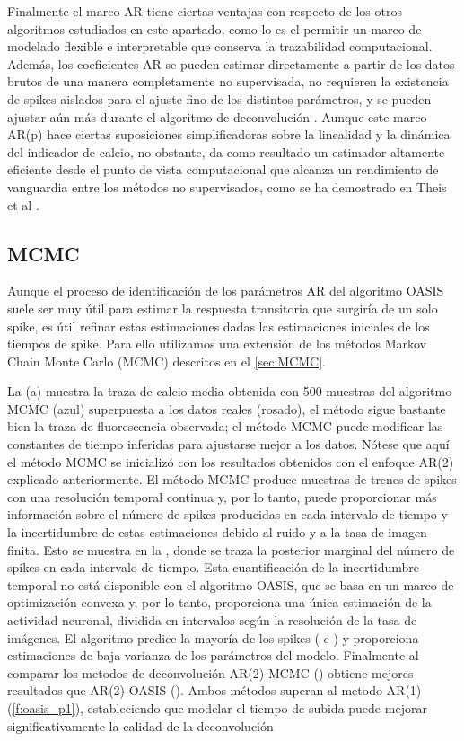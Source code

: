  Finalmente el marco AR tiene ciertas ventajas con respecto de los otros algoritmos estudiados en este apartado, como lo es el  permitir  un marco de modelado flexible e interpretable que conserva la trazabilidad computacional.   Además, los coeficientes AR se pueden estimar directamente a partir de los datos brutos de una manera completamente no supervisada, no requieren la existencia de spikes aislados para el ajuste fino de los distintos parámetros, y se pueden ajustar aún más durante el algoritmo de deconvolución \cite{pnevmatikakis_simultaneous_2016}. Aunque este marco AR(p) hace ciertas suposiciones simplificadoras sobre la linealidad y la dinámica del indicador de calcio, no obstante, da como resultado un estimador altamente eficiente desde el punto de vista computacional que alcanza un rendimiento de vanguardia entre los métodos no supervisados, como se ha demostrado  en Theis et al \cite{theis_benchmarking_2016}.
 
 \subsection{MCMC}
 
 Aunque el proceso de identificación de los parámetros AR del algoritmo OASIS suele ser muy útil para estimar la respuesta transitoria que surgiría de un solo spike, es útil refinar estas estimaciones dadas las estimaciones iniciales de los tiempos de spike. Para ello utilizamos  una extensión de los métodos Markov Chain Monte Carlo (MCMC) descritos en el \cref{sec:MCMC}. 
 
La (a) muestra la traza de calcio media obtenida con 500 muestras del algoritmo MCMC (azul) superpuesta a los datos reales (rosado), el método sigue  bastante bien la  traza de fluorescencia observada; el método MCMC puede modificar las constantes de tiempo inferidas para ajustarse mejor a los datos. Nótese que aquí el método MCMC se inicializó con los resultados obtenidos con el enfoque AR(2) explicado anteriormente. El método MCMC produce muestras de trenes de spikes con una resolución temporal continua y, por lo tanto, puede proporcionar más información sobre el número de spikes producidas en cada intervalo de tiempo y la incertidumbre de estas estimaciones debido al ruido y a la tasa de imagen finita. Esto se muestra en la , donde se traza la posterior marginal del número de spikes en cada intervalo de tiempo. Esta cuantificación de la incertidumbre temporal no está disponible con el algoritmo OASIS, que se basa en un marco de optimización convexa y, por lo tanto, proporciona una única estimación de la actividad neuronal, dividida en intervalos según la resolución de la tasa de imágenes.  El algoritmo predice la mayoría de los spikes ( c ) y proporciona estimaciones de baja varianza de los parámetros del modelo. Finalmente al comparar los metodos de deconvolución   AR(2)-MCMC () obtiene mejores resultados que AR(2)-OASIS (). Ambos métodos superan al metodo  AR(1) (\cref{f:oasis_p1}), estableciendo que modelar el tiempo de subida puede mejorar significativamente la calidad de la deconvolución
 
